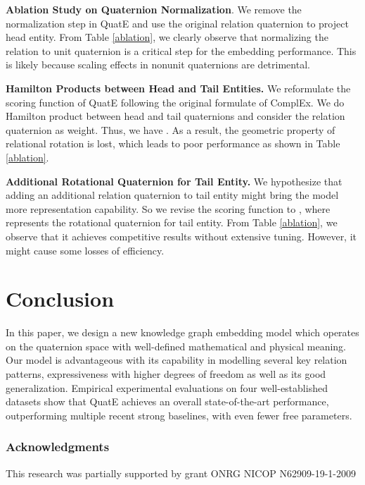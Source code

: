 \documentclass{article}
\begin{document}
\textbf{Ablation Study on Quaternion Normalization}. We remove the normalization step in QuatE and use the original relation quaternion  to project head entity. From Table \ref{ablation}, we clearly observe that normalizing the relation to unit quaternion is a critical step for the embedding performance. This is likely because scaling effects in nonunit quaternions are detrimental.








\textbf{Hamilton Products between Head and Tail Entities.} We reformulate the scoring function of QuatE following the original formulate of ComplEx. We do Hamilton product between head and tail quaternions and consider the relation quaternion as weight. Thus, we have  . As a result, the geometric property of relational rotation is lost, which leads to poor performance  as shown in Table \ref{ablation}.

\textbf{Additional Rotational Quaternion for Tail Entity.} We hypothesize that adding an additional relation quaternion to tail entity might bring the model more representation capability. So we revise the scoring function to , where  represents the rotational quaternion for tail entity. From Table \ref{ablation}, we observe that it achieves competitive results without extensive tuning. However, it might cause some losses of efficiency.



\section{Conclusion}
In this paper, we design a new knowledge graph embedding model which operates on the quaternion space with well-defined mathematical and physical meaning. Our model is advantageous with its capability in modelling several key relation patterns, expressiveness with higher degrees of freedom as well as its good generalization. Empirical experimental evaluations on four well-established datasets show that QuatE achieves an overall state-of-the-art performance, outperforming multiple recent strong baselines, with even fewer free parameters.

\subsubsection*{Acknowledgments}
This research was partially supported by grant ONRG NICOP N62909-19-1-2009
\end{document}
